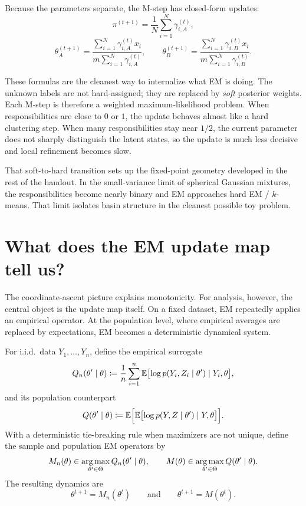\documentclass[11pt]{article}
\begin{document}
Because the parameters separate, the M-step has closed-form updates:
\begin{equation}
  \pi^{(t+1)} = \frac{1}{N}\sum_{i=1}^N \gamma_{i,A}^{(t)},
  \label{eq:em-two-coins-pi-update}
\end{equation}
\begin{equation}
  \theta_A^{(t+1)}
  =
  \frac{\sum_{i=1}^N \gamma_{i,A}^{(t)} x_i}{m\sum_{i=1}^N \gamma_{i,A}^{(t)}},
  \qquad
  \theta_B^{(t+1)}
  =
  \frac{\sum_{i=1}^N \gamma_{i,B}^{(t)} x_i}{m\sum_{i=1}^N \gamma_{i,B}^{(t)}}.
  \label{eq:em-two-coins-theta-update}
\end{equation}

These formulas are the cleanest way to internalize what EM is doing.
The unknown labels are not hard-assigned; they are replaced by \emph{soft} posterior weights.
Each M-step is therefore a weighted maximum-likelihood problem.
When responsibilities are close to $0$ or $1$, the update behaves almost like a hard clustering step.
When many responsibilities stay near $1/2$, the current parameter does not sharply distinguish the latent states, so the update is much less decisive and local refinement becomes slow.

That soft-to-hard transition sets up the fixed-point geometry developed in the rest of the handout.
In the small-variance limit of spherical Gaussian mixtures, the responsibilities become nearly binary and EM approaches hard EM / \texorpdfstring{$k$}{k}-means.
That limit isolates basin structure in the cleanest possible toy problem.

\clearpage
\section[EM as a fixed-point map]{What does the EM update map tell us?}
\label{sec:em-fixed-point-map}

The coordinate-ascent picture explains monotonicity.
For analysis, however, the central object is the update map itself.
On a fixed dataset, EM repeatedly applies an empirical operator.
At the population level, where empirical averages are replaced by expectations, EM becomes a deterministic dynamical system.

For i.i.d.\ data $Y_1,\dots,Y_n$, define the empirical surrogate
\[
Q_n(\theta'\mid\theta)
\coloneqq
\frac{1}{n}\sum_{i=1}^n
\mathbb{E}\bigl[\log p(Y_i,Z_i\mid\theta')\mid Y_i,\theta\bigr],
\]
and its population counterpart
\[
Q(\theta'\mid\theta)
\coloneqq
\mathbb{E}\Big[\mathbb{E}\bigl[\log p(Y,Z\mid\theta')\mid Y,\theta\bigr]\Big].
\]
With a deterministic tie-breaking rule when maximizers are not unique, define the sample and population EM operators by
\[
M_n(\theta)\in\operatorname*{arg\,max}_{\theta'\in\Theta} Q_n(\theta'\mid\theta),
\qquad
M(\theta)\in\operatorname*{arg\,max}_{\theta'\in\Theta} Q(\theta'\mid\theta).
\]
The resulting dynamics are
\[
\theta^{t+1}=M_n(\theta^t)
\qquad\text{and}\qquad
\theta^{t+1}=M(\theta^t).
\]
\end{document}
